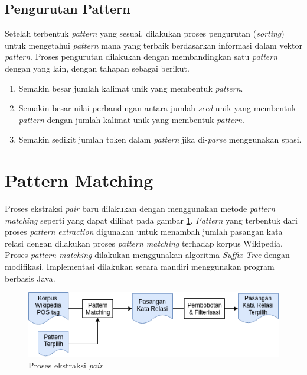 \subsection{Pengurutan Pattern}
Setelah terbentuk \textit{pattern} yang sesuai, dilakukan proses pengurutan (\textit{sorting}) untuk mengetahui \textit{pattern} mana yang terbaik berdasarkan informasi dalam vektor \textit{pattern}. Proses pengurutan dilakukan dengan membandingkan satu \textit{pattern} dengan yang lain, dengan tahapan sebagai berikut.
\begin{enumerate}
  \item Semakin besar jumlah kalimat unik yang membentuk \textit{pattern}.
  \item Semakin besar nilai perbandingan antara jumlah \textit{seed} unik yang membentuk \textit{pattern} dengan jumlah kalimat unik yang membentuk \textit{pattern}.
  \item Semakin sedikit jumlah token dalam \textit{pattern} jika di-\textit{parse} menggunakan spasi.
\end{enumerate}

%
\section{Pattern Matching}
Proses ekstraksi \textit{pair} baru dilakukan dengan menggunakan metode \textit{pattern matching} seperti yang dapat dilihat pada gambar \ref{fig:pattern-matching}. \textit{Pattern} yang terbentuk dari proses \textit{pattern extraction} digunakan untuk menambah jumlah pasangan kata relasi dengan dilakukan proses \textit{pattern matching} terhadap korpus Wikipedia. Proses \textit{pattern matching} dilakukan menggunakan algoritma \textit{Suffix Tree} dengan modifikasi. Implementasi dilakukan secara mandiri menggunakan program berbasis Java.

\begin{figure}
    \centering
    \includegraphics[scale=0.6]{pics/Pic04-PatternMatching}
    \caption{Proses ekstraksi \textit{pair}}
    \label{fig:pattern-matching}
\end{figure}

